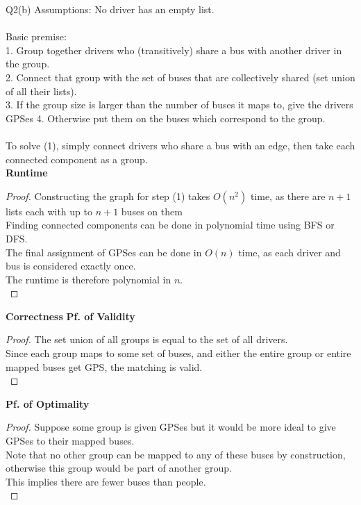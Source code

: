 \begin{problem}
    {Q2(b)}
    Assumptions: No driver has an empty list. \\\\
    Basic premise: \\
    1. Group together drivers who (transitively) share a bus with another driver in the group. \\
    2. Connect that group with the set of buses that are collectively shared (set union of all their lists). \\
    3. If the group size is larger than the number of buses it maps to, give the drivers GPSes
    4. Otherwise put them on the buses which correspond to the group. \\\\
    To solve (1), simply connect drivers who share a bus with an edge, then take each connected component as a group. \\
    \noindent
    \textbf{Runtime}
    \begin{proof}
        Constructing the graph for step (1) takes $O(n^2)$ time, as there are $n+1$ lists each with up to $n+1$ buses on them \\
        Finding connected components can be done in polynomial time using BFS or DFS. \\
        The final assignment of GPSes can be done in $O(n)$ time, as each driver and bus is considered exactly once. \\
        The runtime is therefore polynomial in $n$. \\
    \end{proof}
    \noindent
    \textbf{Correctness}
    \noindent
    \textbf{Pf. of Validity}
    \begin{proof}
        The set union of all groups is equal to the set of all drivers. \\
        Since each group maps to some set of buses, and either the entire group or entire mapped buses get GPS, the matching is valid. \\
    \end{proof}
    \noindent
    \textbf{Pf. of Optimality}
    \begin{proof}
        Suppose some group is given GPSes but it would be more ideal to give GPSes to their mapped buses. \\
        Note that no other group can be mapped to any of these buses by construction, otherwise this group would be part of another group. \\
        This implies there are fewer buses than people. \\

\end{proof}
\end{problem}
